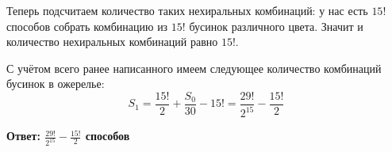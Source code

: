 \documentclass[a4paper,12pt]{article} %
\begin{document}
Теперь подсчитаем количество таких нехиральных комбинаций: у нас есть $15!$ способов собрать комбинацию из $15!$ бусинок различного цвета. Значит и количество нехиральных комбинаций равно $15!$.

С учётом всего ранее написанного имеем следующее количество комбинаций бусинок в ожерелье:
\[S_1 = \frac{15!}{2} + \frac{S_0}{30} - 15! = \frac{29!}{2^{15}} - \frac{15!}{2}\]

\begin{flushright}
\begin{large}
\textbf {Ответ: $\frac{29!}{2^{15}} - \frac{15!}{2}$ способов}
\end{large}
\end{flushright}
\end{document}
